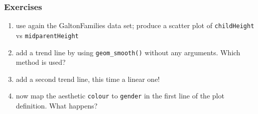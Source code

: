 \documentclass[xcolor={table}]{beamer}
\begin{document}
\begin{frame}[allowframebreaks]\frametitle{Exercises}
  \begin{enumerate}
  \item use again the GaltonFamilies data set; produce a scatter plot of \texttt{childHeight} vs \texttt{midparentHeight}
  \item add a trend line by using \texttt{geom\_smooth()} without any arguments. Which method is used?
  \item add a second trend line, this time a linear one!
  \item now map the aesthetic \texttt{colour} to \texttt{gender} in the first line of the plot definition. What happens?
  \end{enumerate}
\end{frame}
\end{document}
